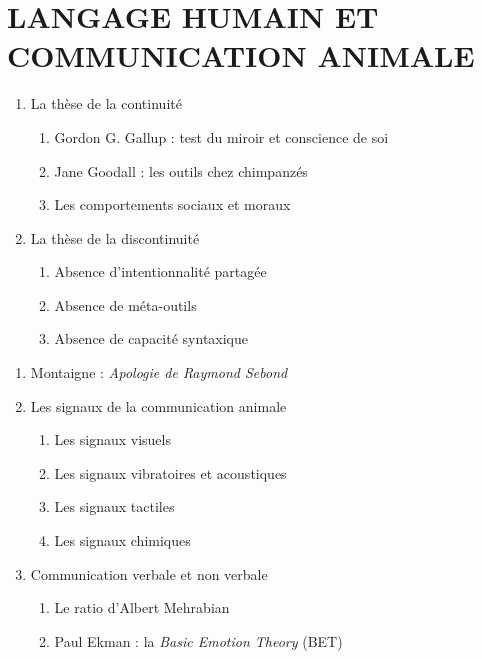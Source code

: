 \chapter{LANGAGE HUMAIN ET COMMUNICATION ANIMALE}
\begingroup\small{}\setlength{\parskip}{2pt}
\begin{enumerate}[label=\arabic*.]
\item La thèse de la continuité
\begin{enumerate}[label=\textbf{\arabic*},nosep]
\item Gordon G. Gallup : test du miroir et conscience de soi
\item Jane Goodall : les outils chez chimpanzés
\item Les comportements sociaux et moraux
\end{enumerate}
\item La thèse de la discontinuité
\begin{enumerate}[label=\textbf{\arabic*},nosep]
\item Absence d’intentionnalité partagée
\item Absence de méta-outils
\item Absence de capacité syntaxique
\end{enumerate}
\end{enumerate}
\begin{enumerate}[label=\arabic*.]
\item Montaigne : \textit{Apologie de Raymond Sebond}
\item Les signaux de la communication animale
\begin{enumerate}[label=\textbf{\arabic*},nosep]
\item Les signaux visuels
\item Les signaux vibratoires et acoustiques
\item Les signaux tactiles
\item Les signaux chimiques
\end{enumerate}
\item Communication verbale et non verbale
\begin{enumerate}[label=\textbf{\arabic*},nosep]
\item Le ratio d’Albert Mehrabian
\item Paul Ekman : la \textit{Basic Emotion Theory} (BET)
\end{enumerate}
\end{enumerate}
